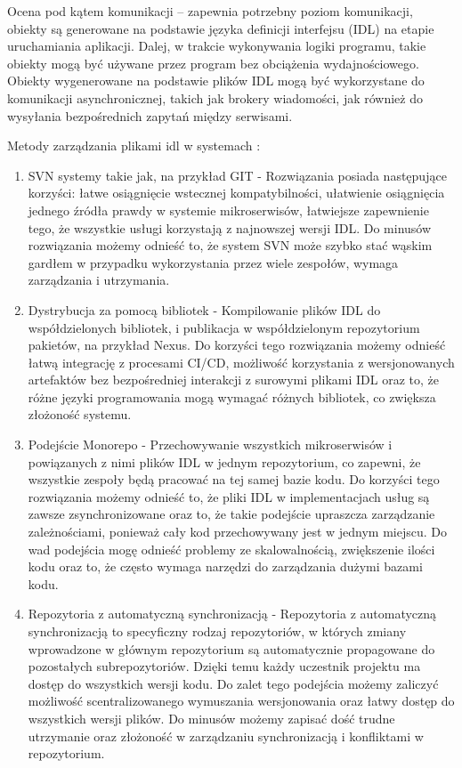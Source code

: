\documentclass[runningheads,12pt]{llncs}
\begin{document}
Ocena pod kątem komunikacji – zapewnia potrzebny poziom komunikacji, obiekty są generowane na podstawie języka definicji interfejsu (IDL) na etapie uruchamiania aplikacji. Dalej, w trakcie wykonywania logiki programu, takie obiekty mogą być używane przez program bez obciążenia wydajnościowego. Obiekty wygenerowane na podstawie plików IDL mogą być wykorzystane do komunikacji asynchronicznej, takich jak brokery wiadomości, jak również do wysyłania bezpośrednich zapytań między serwisami.

Metody zarządzania plikami idl w systemach : 

\begin{enumerate}
    \item SVN systemy takie jak, na przykład GIT - Rozwiązania posiada następujące korzyści: łatwe osiągnięcie wstecznej kompatybilności, ułatwienie osiągnięcia jednego źródła prawdy w systemie mikroserwisów, łatwiejsze zapewnienie tego, że wszystkie usługi korzystają z najnowszej wersji IDL. Do minusów rozwiązania możemy odnieść to, że system SVN może szybko stać wąskim gardłem w przypadku wykorzystania przez wiele zespołów, wymaga zarządzania i utrzymania.
    \item Dystrybucja za pomocą bibliotek - Kompilowanie plików IDL do współdzielonych bibliotek, i publikacja w współdzielonym repozytorium pakietów, na przykład Nexus. Do korzyści tego rozwiązania możemy odnieść łatwą integrację z procesami CI/CD, możliwość korzystania z wersjonowanych artefaktów bez bezpośredniej interakcji z surowymi plikami IDL oraz to, że różne języki programowania mogą wymagać różnych bibliotek, co zwiększa złożoność systemu.
    \item Podejście Monorepo - Przechowywanie wszystkich mikroserwisów i powiązanych z nimi plików IDL w jednym repozytorium, co zapewni, że wszystkie zespoły będą pracować na tej samej bazie kodu. Do korzyści tego rozwiązania możemy odnieść to, że pliki IDL w implementacjach usług są zawsze zsynchronizowane oraz to, że takie podejście upraszcza zarządzanie zależnościami, ponieważ cały kod przechowywany jest w jednym miejscu. Do wad podejścia mogę odnieść problemy ze skalowalnością, zwiększenie ilości kodu oraz to, że często wymaga narzędzi do zarządzania dużymi bazami kodu.
    \item Repozytoria z automatyczną synchronizacją - Repozytoria z automatyczną synchronizacją to specyficzny rodzaj repozytoriów, w których zmiany wprowadzone w głównym repozytorium są automatycznie propagowane do pozostałych subrepozytoriów. Dzięki temu każdy uczestnik projektu ma dostęp do wszystkich wersji kodu. Do zalet tego podejścia możemy zaliczyć możliwość scentralizowanego wymuszania wersjonowania oraz łatwy dostęp do wszystkich wersji plików. Do minusów możemy zapisać dość trudne utrzymanie oraz złożoność w zarządzaniu synchronizacją i konfliktami w repozytorium.

\end{enumerate}
\end{document}
